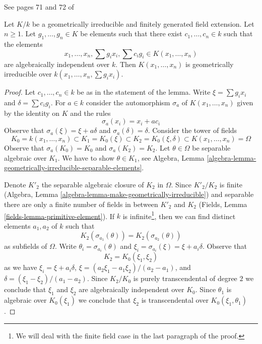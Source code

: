 \begin{lemma}
\label{lemma-amazing-bertini-lemma}
\begin{reference}
See pages 71 and 72 of \cite{Jou}
\end{reference}
Let $K/k$ be a geometrically irreducible and finitely generated
field extension. Let $n \geq 1$.
Let $g_1, \ldots, g_n \in K$ be elements such that there
exist $c_1, \ldots, c_n \in k$ such that the elements
$$
x_1, \ldots, x_n, \sum g_ix_i, \sum c_ig_i \in K(x_1, \ldots, x_n)
$$
are algebraically independent over $k$. Then
$K(x_1, \ldots, x_n)$ is geometrically irreducible over
$k(x_1, \ldots, x_n, \sum g_ix_i)$.
\end{lemma}

\begin{proof}
Let $c_1, \ldots, c_n \in k$ be as in the statement of the lemma.
Write $\xi = \sum g_ix_i$ and $\delta = \sum c_ig_i$.
For $a \in k$ consider the automorphism $\sigma_a$
of $K(x_1, \ldots, x_n)$ given by the identity on $K$ and the rules
$$
\sigma_a(x_i) = x_i + a c_i
$$
Observe that $\sigma_a(\xi) = \xi + a \delta$ and $\sigma_a(\delta) = \delta$.
Consider the tower of fields
$$
K_0 = k(x_1, \ldots, x_n) \subset
K_1 = K_0(\xi) \subset
K_2 = K_0(\xi, \delta) \subset K(x_1, \ldots, x_n) = \Omega
$$
Observe that $\sigma_a(K_0) = K_0$ and $\sigma_a(K_2) = K_2$.
Let $\theta \in \Omega$ be separable algebraic over $K_1$.
We have to show $\theta \in K_1$, see Algebra, Lemma
\ref{algebra-lemma-geometrically-irreducible-separable-elements}.

\medskip\noindent
Denote $K'_2$ the separable algebraic closure of $K_2$ in $\Omega$.
Since $K'_2/K_2$ is finite (Algebra, Lemma
\ref{algebra-lemma-make-geometrically-irreducible}) and
separable there are only a finite number of fields in
between $K'_2$ and $K_2$ (Fields, Lemma \ref{fields-lemma-primitive-element}).
If $k$ is infinite\footnote{We will deal with the finite field case in the
last paragraph of the proof.}, then we can find distinct elements
$a_1, a_2$ of $k$ such that
$$
K_2(\sigma_{a_1}(\theta)) = K_2(\sigma_{a_2}(\theta))
$$
as subfields of $\Omega$. Write $\theta_i = \sigma_{a_i}(\theta)$
and $\xi_i = \sigma_{a_i}(\xi) = \xi + a_i \delta$. Observe that
$$
K_2 = K_0(\xi_1, \xi_2)
$$
as we have $\xi_i = \xi + a_i \delta$,
$\xi = (a_2 \xi_1 - a_1 \xi_2)/(a_2 - a_1)$, and
$\delta = (\xi_1 - \xi_2)/(a_1 - a_2)$.
Since $K_2/K_0$ is purely transcendental of degree $2$ we conclude
that $\xi_1$ and $\xi_2$ are algebraically independent over $K_0$.
Since $\theta_1$ is algebraic over $K_0(\xi_1)$ we conclude that
$\xi_2$ is transcendental over $K_0(\xi_1, \theta_1)$.


\end{proof}
